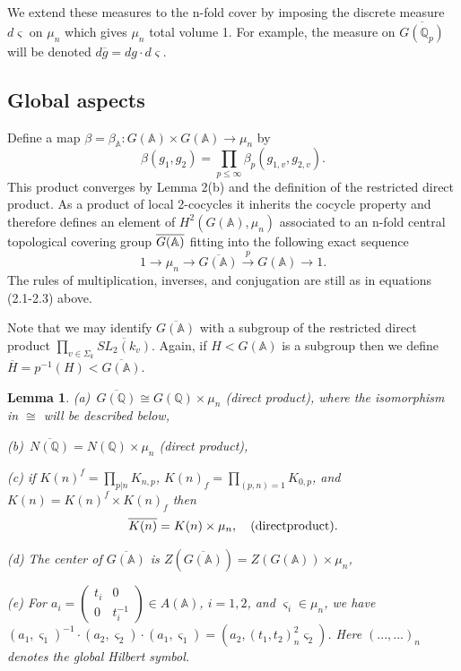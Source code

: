 \documentclass[amsfonts,12pt]{article}
\newtheorem{lemma}[theorem]{Lemma}
\def\aaa{\mathbb{A}}
\def\qqq{\mathbb{Q}}
\begin{document}
We extend these measures to the n-fold cover by imposing the discrete
measure $d\varsigma $ on $\mu _n$ which gives $\mu _n$ total volume 1. For
example, the measure on $\overline{G(\qqq_p)}$ will be denoted $d%
\overline{g}=dg\cdot d\varsigma $.

\subsection{Global aspects}

Define a map $\beta =\beta _{\aaa }:G(\aaa )\times G(\aaa )\rightarrow
\mu _n$ by 
\[
\beta (g_1,g_2)=\prod_{p\leq \infty }\beta _p(g_{1,v},g_{2,v}).
\]
This product converges by Lemma 2(b) and the definition of the restricted
direct product. As a product of local 2-cocycles it inherits the cocycle
property and therefore defines an element of $H^2(G(\aaa ),\mu _n)$
associated to an n-fold central topological covering group $\overline{G(\Bbb{%
A})}$ fitting into the following exact sequence 
\begin{equation}
1\rightarrow \mu _n\rightarrow \overline{G(\aaa )}\stackrel{p}{\rightarrow 
}G(\aaa )\rightarrow 1.
\end{equation}
The rules of multiplication, inverses, and conjugation are still as in
equations (2.1-2.3) above.

Note that we may identify $\overline{G(\aaa )}$ with a subgroup of the
restricted direct product
$\prod_{v\in \Sigma _k}\overline{SL_2(k_v)}$. Again,
if $H<G(\aaa )$ is a subgroup then we define
$\overline{H}=p^{-1}(H)<\overline{G(\aaa )}$.

\begin{lemma}
(a)\ $\overline{G(\qqq)}\cong G(\qqq)\times \mu _n$
(direct product), where the isomorphism in $\cong$ will be
described below,

(b)\ $\overline{N(\qqq)}=N(\qqq)\times \mu _n$ (direct product),

(c) if $K(n)^f=\prod_{p|n}K_{n,p}$, $K(n)_f=\prod_{(p,n)=1}K_{0,p}$, and
$K(n)=K(n)^f\times K(n)_f$ then 
\[
\overline{K(n)}=K(n)\times \mu _n,
\ \ \ {\rm (direct product)}.
\]

(d) The center of $\overline{G(\aaa )}$ is
$Z(\overline{G(\aaa )})=Z(G({\aaa }))\times \mu _n$,

(e) For $a_i=\left( 
\begin{array}{cc}
t_i & 0 \\ 
0 & t_i^{-1}
\end{array}
\right) \in A(\aaa )$, $i=1,2$, and $\varsigma _i\in \mu _n$, we have $%
(a_1,\varsigma _1)^{-1}\cdot (a_2,\varsigma _2)\cdot (a_1,\varsigma
_1)=(a_2,(t_1,t_2)_n^2\varsigma _2)$. Here $(...,...)_n$ denotes the global
Hilbert symbol.
\end{lemma}
\end{document}
